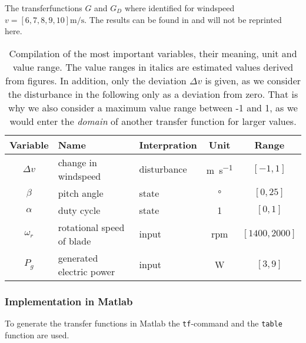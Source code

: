 The transferfunctions $G$ and $G_D$ where identified for windspeed $v=\left[6,7,8,9,10 \right] \si{\metre\per\second}$.
The results can be found in \cite[Table 2]{Fragoso_et_al_2017} and will not be reprinted here.

\begin{table}[H]
    \label{tab:analysis:import_var}
    \caption{Compilation of the most important variables, their meaning, unit and value range. The value ranges in italics are estimated values derived from figures. In addition, only the deviation $\Delta v$ is given, as we consider the disturbance in the following only as a deviation from zero. That is why we also consider a maximum value range between -1 and 1, as we would enter the \textit{domain} of another transfer function for larger values.}
    \centering
    \begin{tabular}{cllcc} \toprule
        Variable & Name & Interpration & Unit & Range \\ \midrule
        $\Delta v$ & change in windspeed & disturbance  & \si{\metre\per\second} & $\mathit{\left[-1,1\right]}$\\
        $\beta$ & pitch angle & state & \si{\degree}& $\left[0,25\right]$ \\
        $\alpha$ & duty cycle& state & 1 & $\left[0,1\right]$\\
        $\omega_r$ & rotational speed of blade & input & rpm & $\mathit{\left[1400,2000 \right]}$  \\
        $P_g$ &generated electric power &input & \si{\watt} &  $\mathit{\left[3,9 \right]}$\\ \bottomrule
    \end{tabular}
\end{table}

\subsubsection*{Implementation in Matlab}

To generate the transfer functions in Matlab the \texttt{tf}-command and the \texttt{table} function are used.


